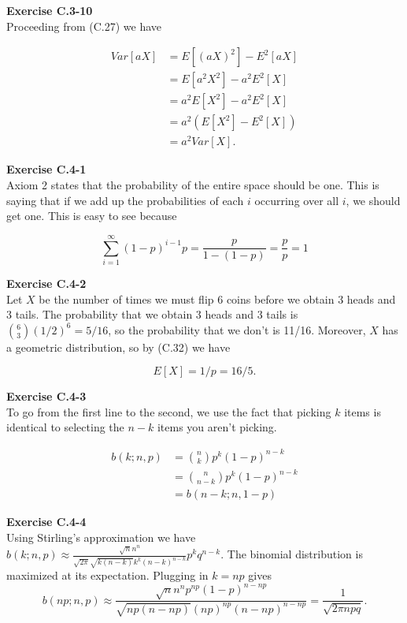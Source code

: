 \documentclass{article}
\begin{document}
\noindent\textbf{Exercise C.3-10}\\

Proceeding from (C.27) we have

\begin{align*}
Var[aX] &= E[(aX)^2] - E^2[aX] \\
&= E[a^2X^2] - a^2E^2[X] \\
&= a^2E[X^2] - a^2E^2[X]\\
&=a^2(E[X^2] - E^2[X])\\
&= a^2Var[X].
\end{align*}

\noindent\textbf{Exercise C.4-1}\\

Axiom 2 states that the probability of the entire space should be one. This is saying that if we add up the probabilities of each $i$ occurring over all $i$, we should get one. This is easy to see because

\[
\sum_{i=1}^{\infty} (1-p)^{i-1} p = \frac{p}{1-(1-p)} = \frac{p}{p} = 1
\]

\noindent\textbf{Exercise C.4-2}\\

Let $X$ be the number of times we must flip 6 coins before we obtain 3 heads and 3 tails.  The probability that we obtain 3 heads and 3 tails is ${6 \choose 3}(1/2)^6 = 5/16$, so the probability that we don't is 11/16.  Moreover, $X$ has a geometric distribution, so by (C.32) we have

\[ E[X] = 1/p = 16/5.\]

\noindent\textbf{Exercise C.4-3}\\

To go from the first line to the second, we use the fact that picking $k$ items is identical to selecting the $n-k$ items you aren't picking.

\begin{align*}
b(k;n,p) &= \binom{n}{k} p^k (1-p)^{n-k}\\
&= \binom{n}{n-k}p^{k}(1-p)^{n-k}\\
&= b(n-k;n,1-p)
\end{align*}

\noindent\textbf{Exercise C.4-4}\\

Using Stirling's approximation we have $b(k;n,p) \approx \frac{\sqrt{n}n^n}{\sqrt{2\pi}\sqrt{k(n-k)}k^k(n-k)^{n-k}}p^kq^{n-k}$.  The binomial distribution is maximized at its expectation.  Plugging in $k=np$ gives 
\[ b(np;n,p) \approx \frac{\sqrt{n}n^np^{np}(1-p)^{n-np}}{\sqrt{np(n-np)}(np)^{np}(n-np)^{n-np}} = \frac{1}{\sqrt{2\pi n p q}}.\]
\end{document}
